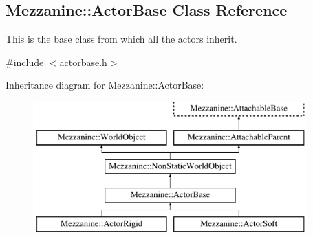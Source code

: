 \hypertarget{classMezzanine_1_1ActorBase}{
\subsection{Mezzanine::ActorBase Class Reference}
\label{classMezzanine_1_1ActorBase}
}


This is the base class from which all the actors inherit.  




{\ttfamily \#include $<$actorbase.h$>$}

Inheritance diagram for Mezzanine::ActorBase:\begin{figure}[H]
\begin{center}
\leavevmode
\includegraphics[height=5.000000cm]{classMezzanine_1_1ActorBase}
\end{center}
\end{figure}
